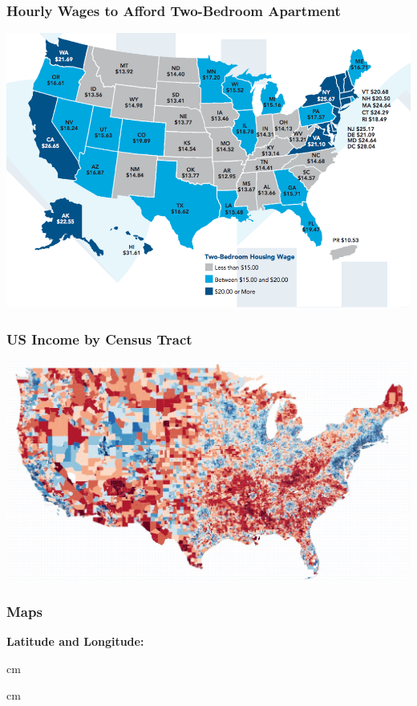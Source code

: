 \documentclass{beamer} %
\begin{document}
\begin{frame}\frametitle{Hourly Wages to Afford Two-Bedroom Apartment}
	\includegraphics[width=\linewidth]{hourly.png}
\end{frame}



\begin{frame}\frametitle{US Income by Census Tract}
	\includegraphics[width=\linewidth]{income-tract.jpg}
\end{frame}



\begin{frame}\frametitle{Maps}
	\small
	
	\textbf{Latitude and Longitude:}  

	
	
	 cm
	
	
	 cm
	
\end{frame}
\end{document}
